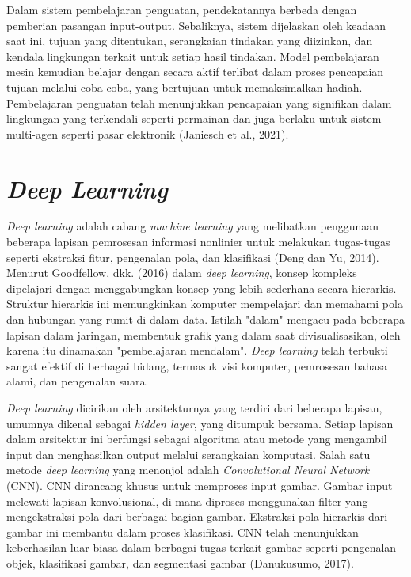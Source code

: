 Dalam sistem pembelajaran penguatan, pendekatannya berbeda dengan pemberian pasangan input-output. Sebaliknya, sistem dijelaskan oleh keadaan saat ini, tujuan yang ditentukan, serangkaian tindakan yang diizinkan, dan kendala lingkungan terkait untuk setiap hasil tindakan. Model pembelajaran mesin kemudian belajar dengan secara aktif terlibat dalam proses pencapaian tujuan melalui coba-coba, yang bertujuan untuk memaksimalkan hadiah. Pembelajaran penguatan telah menunjukkan pencapaian yang signifikan dalam lingkungan yang terkendali seperti permainan dan juga berlaku untuk sistem multi-agen seperti pasar elektronik (Janiesch et al., 2021).

\section{\emph{Deep Learning}}
\label{sec:deeplearning}

\emph{Deep learning} adalah cabang \emph{machine learning} yang melibatkan penggunaan beberapa lapisan pemrosesan informasi nonlinier untuk melakukan tugas-tugas seperti ekstraksi fitur, pengenalan pola, dan klasifikasi (Deng dan Yu, 2014). Menurut Goodfellow, dkk. (2016) dalam \emph{deep learning}, konsep kompleks dipelajari dengan menggabungkan konsep yang lebih sederhana secara hierarkis. Struktur hierarkis ini memungkinkan komputer mempelajari dan memahami pola dan hubungan yang rumit di dalam data. Istilah "dalam" mengacu pada beberapa lapisan dalam jaringan, membentuk grafik yang dalam saat divisualisasikan, oleh karena itu dinamakan "pembelajaran mendalam". \emph{Deep learning} telah terbukti sangat efektif di berbagai bidang, termasuk visi komputer, pemrosesan bahasa alami, dan pengenalan suara.

\emph{Deep learning} dicirikan oleh arsitekturnya yang terdiri dari beberapa lapisan, umumnya dikenal sebagai \emph{hidden layer}, yang ditumpuk bersama. Setiap lapisan dalam arsitektur ini berfungsi sebagai algoritma atau metode yang mengambil input dan menghasilkan output melalui serangkaian komputasi. Salah satu metode \emph{deep learning} yang menonjol adalah \emph{Convolutional Neural Network} (CNN). CNN dirancang khusus untuk memproses input gambar. Gambar input melewati lapisan konvolusional, di mana diproses menggunakan filter yang mengekstraksi pola dari berbagai bagian gambar. Ekstraksi pola hierarkis dari gambar ini membantu dalam proses klasifikasi. CNN telah menunjukkan keberhasilan luar biasa dalam berbagai tugas terkait gambar seperti pengenalan objek, klasifikasi gambar, dan segmentasi gambar (Danukusumo, 2017).

